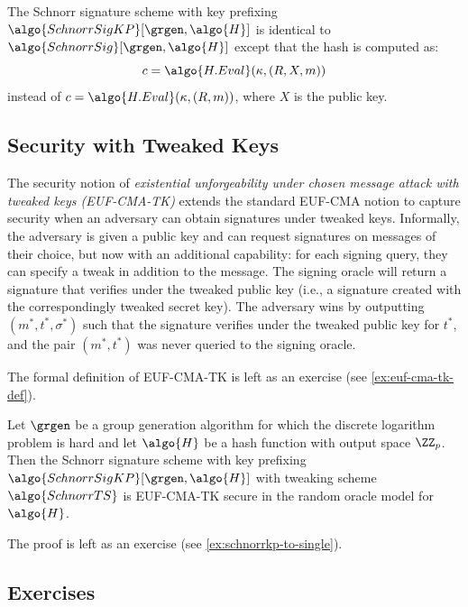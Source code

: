 \begin{definition}\label{def:schnorr-kp}
  The Schnorr signature scheme with key prefixing $\algo{SchnorrSigKP}[\grgen, \algo{H}]$ is identical to $\algo{SchnorrSig}[\grgen, \algo{H}]$ except that the hash is computed as:
  \[
    c = \algo{H.Eval}(\kappa, (R, X, m))
  \]
  instead of $c = \algo{H.Eval}(\kappa, (R, m))$, where $X$ is the public key.
\end{definition}

\subsection{Security with Tweaked Keys}

The security notion of \emph{existential unforgeability under chosen message attack with tweaked keys (EUF-CMA-TK)}\label{def:euf-cma-tk-informal} extends the standard EUF-CMA notion to capture security when an adversary can obtain signatures under tweaked keys.
Informally, the adversary is given a public key and can request signatures on messages of their choice, but now with an additional capability: for each signing query, they can specify a tweak in addition to the message.
The signing oracle will return a signature that verifies under the tweaked public key (i.e., a signature created with the correspondingly tweaked secret key).
The adversary wins by outputting $(m^*, t^*, \sigma^*)$ such that the signature verifies under the tweaked public key for $t^*$, and the pair $(m^*, t^*)$ was never queried to the signing oracle.

The formal definition of EUF-CMA-TK is left as an exercise (see \autoref{ex:euf-cma-tk-def}).

\begin{theorem}\label{thm:schnorrkp-euf-cma-tk}
  Let $\grgen$ be a group generation algorithm for which the discrete logarithm problem is hard and let $\algo{H}$ be a hash function with output space $\ZZ_p$.
  Then the Schnorr signature scheme with key prefixing $\algo{SchnorrSigKP}[\grgen, \algo{H}]$ with tweaking scheme $\algo{SchnorrTS}$ is EUF-CMA-TK secure in the random oracle model for $\algo{H}$.
\end{theorem}

The proof is left as an exercise (see \autoref{ex:schnorrkp-to-single}).

\subsection{Exercises}

